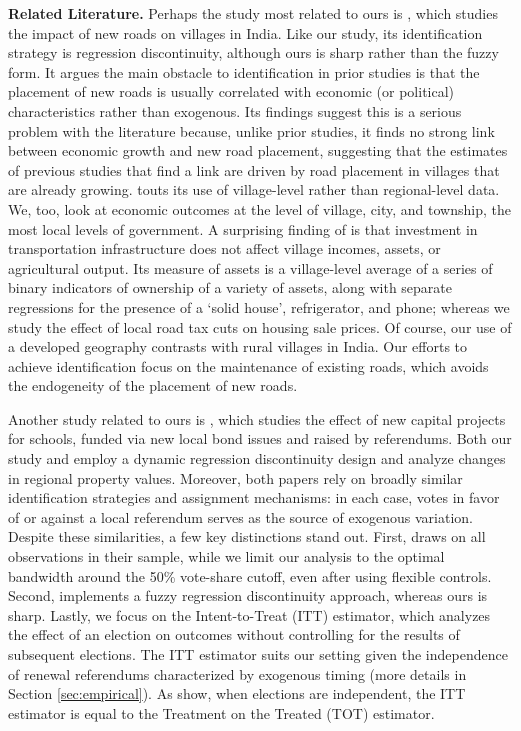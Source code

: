 {\bf Related Literature.} Perhaps the study most related to ours is \cite{asher2020}, which studies the impact of new roads on villages in India. Like our study, its identification strategy is regression discontinuity, although ours is sharp rather than the fuzzy form.  It argues the main obstacle to identification in prior studies is that the placement of new roads is usually correlated with economic (or political) characteristics rather than exogenous. Its findings suggest this is a serious problem with the literature because, unlike prior studies, it finds no strong link between economic growth and new road placement, suggesting that the estimates of previous studies that find a link are driven by road placement in villages that are already growing. \cite{asher2020} touts its use of village-level rather than regional-level data.  We, too, look at economic outcomes at the level of village, city, and township, the most local levels of government.  A surprising finding of \cite{asher2020} is that investment in transportation infrastructure does not affect village incomes, assets, or agricultural output.  Its measure of assets is a village-level average of a series of binary indicators of ownership of a variety of assets, along with separate regressions for the presence of a ‘solid house’, refrigerator, and phone; whereas we study the effect of local road tax cuts on housing sale prices.  Of course, our use of a developed geography contrasts with rural villages in India.  Our efforts to achieve identification focus on the maintenance of existing roads, which avoids the endogeneity of the placement of new roads.

Another study related to ours is \cite{cellini2010value}, which studies the effect of new capital projects for schools, funded via new local bond issues and raised by referendums. Both our study and \cite{cellini2010value} employ a dynamic regression discontinuity design and analyze changes in regional property values. Moreover, both papers rely on broadly similar identification strategies and assignment mechanisms: in each case, votes in favor of or against a local referendum serves as the source of exogenous variation. Despite these similarities, a few key distinctions stand out. First, \cite{cellini2010value} draws on all observations in their sample, while we limit our analysis to the optimal bandwidth around the 50\% vote-share cutoff, even after using flexible controls. Second, \cite{cellini2010value} implements a fuzzy regression discontinuity approach, whereas ours is sharp. Lastly, we focus on the Intent-to-Treat (ITT) estimator, which analyzes the effect of an election on outcomes without controlling for the results of subsequent elections. The ITT estimator suits our setting given the independence of renewal referendums characterized by exogenous timing (more details in Section \ref{sec:empirical}). As \cite{cellini2010value} show, when elections are independent, the ITT estimator is equal to the Treatment on the Treated (TOT) estimator. 

